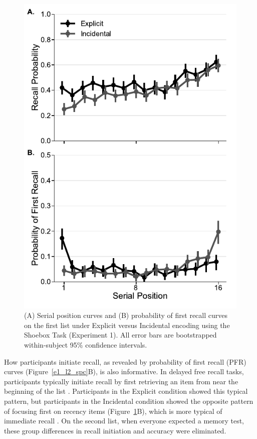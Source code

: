 \documentclass[man,natbib,floatsintext]{apa6} %
\begin{document}
\newcommand\spcpaneltext{All error bars are bootstrapped within-subject 95\% confidence intervals.}
\begin{figure}
\includegraphics{figures/E1_spc_list1.pdf}
\caption{(A) Serial position curves and (B) probability of first recall curves on the first list under Explicit versus Incidental encoding using the Shoebox Task (Experiment 1). \spcpaneltext}
\label{e1_l1_spc}
\end{figure}

How participants initiate recall, as revealed by probability of first recall (PFR) curves (Figure~\ref{e1_l2_spc}B), is also informative. In delayed free recall tasks, participants typically initiate recall by first retrieving an item from near the beginning of the list \citep[i.e., they focus first on primacy items;][]{HowaKaha99}. Participants in the Explicit condition showed this typical pattern, but participants in the Incidental condition showed the opposite pattern of focusing first on recency items (Figure~\ref{e1_l1_spc}B), which is more typical of immediate recall \citep{Hoga75}. On the second list, when everyone expected a memory test, these group differences in recall initiation and accuracy were eliminated.
\end{document}
